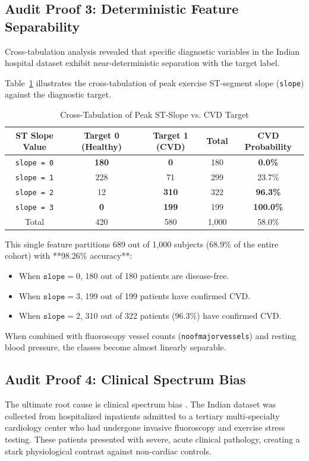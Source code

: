 \documentclass[conference]{IEEEtran}
\begin{document}
\subsection{Audit Proof 3: Deterministic Feature Separability}
Cross-tabulation analysis revealed that specific diagnostic variables in the Indian hospital dataset exhibit near-deterministic separation with the target label.

Table~\ref{tab:crosstab} illustrates the cross-tabulation of peak exercise ST-segment slope (\texttt{slope}) against the diagnostic target.

\begin{table}[htbp]
\caption{Cross-Tabulation of Peak ST-Slope vs. CVD Target}
\label{tab:crosstab}
\centering
\small
\begin{tabular}{ccccc}
\toprule
\textbf{ST Slope Value} & \textbf{Target 0 (Healthy)} & \textbf{Target 1 (CVD)} & \textbf{Total} & \textbf{CVD Probability} \\
\midrule
\texttt{slope = 0} & \textbf{180} & \textbf{0} & 180 & \textbf{0.0\%} \\
\texttt{slope = 1} & 228 & 71 & 299 & 23.7\% \\
\texttt{slope = 2} & 12 & \textbf{310} & 322 & \textbf{96.3\%} \\
\texttt{slope = 3} & \textbf{0} & \textbf{199} & 199 & \textbf{100.0\%} \\
\midrule
Total & 420 & 580 & 1,000 & 58.0\% \\
\bottomrule
\end{tabular}
\end{table}

This single feature partitions 689 out of 1,000 subjects ($68.9\%$ of the entire cohort) with **98.26\% accuracy**:
\begin{itemize}
    \item When $\texttt{slope}=0$, 180 out of 180 patients are disease-free.
    \item When $\texttt{slope}=3$, 199 out of 199 patients have confirmed CVD.
    \item When $\texttt{slope}=2$, 310 out of 322 patients ($96.3\%$) have confirmed CVD.
\end{itemize}
When combined with fluoroscopy vessel counts (\texttt{noofmajorvessels}) and resting blood pressure, the classes become almost linearly separable.

\subsection{Audit Proof 4: Clinical Spectrum Bias}
The ultimate root cause is clinical spectrum bias \cite{moons2025}. The Indian dataset was collected from hospitalized inpatients admitted to a tertiary multi-specialty cardiology center who had undergone invasive fluoroscopy and exercise stress testing. These patients presented with severe, acute clinical pathology, creating a stark physiological contrast against non-cardiac controls. 
\end{document}
